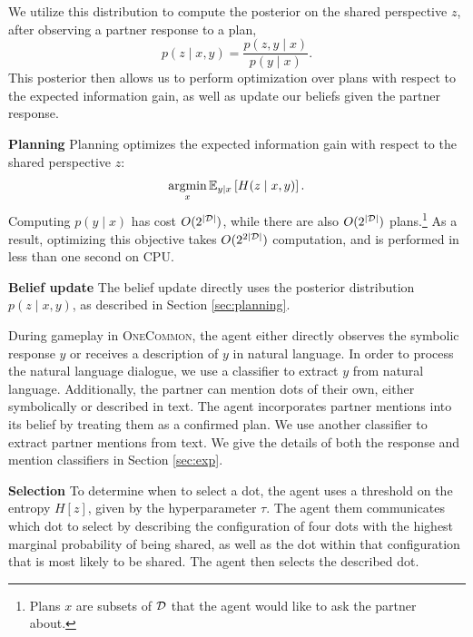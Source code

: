 \documentclass[11pt]{article}
\newcommand{\daniel}[1]{{{\textcolor{brown}{(Daniel: #1)}}}}
\begin{document}

We utilize this distribution to compute the posterior on the shared perspective $z$, after observing a partner response to a plan,
$$ p(z \mid x,y) = \frac{ p(z, y \mid x)}{p(y \mid x)}.$$
This posterior then allows us to perform optimization over plans with respect to the expected information gain, as well as update our beliefs given the partner response.


\noindent \textbf{Planning} Planning optimizes the expected information gain with respect to the shared perspective $z$:
$$\operatorname*{argmin}_x \mathbb{E}_{y\mid x}\left[H(z \mid x,y)\right].$$
Computing $p(y \mid x)$ has cost $O(2^{|\mathcal{D}|})$,
while there are also $O(2^{|\mathcal{D}|})$ plans.\footnote{
Plans $x$ are subsets of $\mathcal{D}$ that the agent would like to ask the partner about.
}
As a result, optimizing this objective takes $O(2^{2|\mathcal{D}|})$ computation, and is performed in less than one second on CPU.%

\textbf{Belief update}
The belief update directly uses the posterior distribution $p(z \mid x,y)$, as described in Section \ref{sec:planning}.

During gameplay in \textsc{OneCommon}, the agent either directly observes the symbolic response $y$ or receives a description of $y$ in natural language.
In order to process the natural language dialogue,
we use a classifier to extract $y$ from natural language. 
Additionally, the partner can mention dots of their own, either symbolically or described in text.
The agent incorporates partner mentions into its belief by treating them as a confirmed plan.
We use another classifier to extract partner mentions from text.
We give the details of both the response and mention classifiers in Section \ref{sec:exp}.

\textbf{Selection}
To determine when to select a dot, the agent uses a threshold on the entropy $H[z]$, given by the hyperparameter $\tau$.
The agent them communicates which dot to select by
describing the configuration of four dots with the
highest marginal probability of being shared,
as well as the dot within that configuration that is most likely to be shared.
The agent then selects the described dot.
\end{document}
